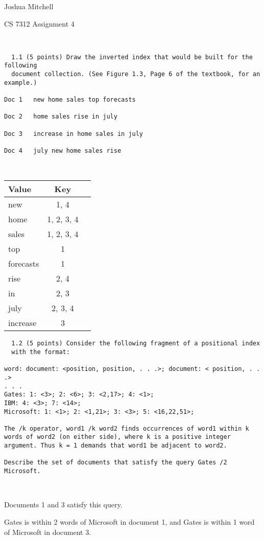 \documentclass[12pt]{article}
\begin{document}
Joshua Mitchell

CS 7312 Assignment 4

\

\begin{verbatim}
  1.1 (5 points) Draw the inverted index that would be built for the following
  document collection. (See Figure 1.3, Page 6 of the textbook, for an example.)

Doc 1 	new home sales top forecasts

Doc 2 	home sales rise in july

Doc 3 	increase in home sales in july

Doc 4 	july new home sales rise
\end{verbatim}


\

\begin{tabular}{l|cc}
  Value & Key& \\
  \hline
  new & 1, 4& \\
  home & 1, 2, 3, 4 & \\
  sales & 1, 2, 3, 4 & \\
  top & 1 & \\
  forecasts & 1 & \\
  rise & 2, 4 & \\
  in & 2, 3 & \\
  july & 2, 3, 4 & \\
  increase & 3 &
\end{tabular}

\begin{verbatim}
  1.2 (5 points) Consider the following fragment of a positional index
  with the format: 

word: document: <position, position, . . .>; document: < position, . . .> 
. . .
Gates: 1: <3>; 2: <6>; 3: <2,17>; 4: <1>;
IBM: 4: <3>; 7: <14>;
Microsoft: 1: <1>; 2: <1,21>; 3: <3>; 5: <16,22,51>;

The /k operator, word1 /k word2 finds occurrences of word1 within k words of word2 (on either side), where k is a positive integer argument. Thus k = 1 demands that word1 be adjacent to word2.

Describe the set of documents that satisfy the query Gates /2 Microsoft.
\end{verbatim}

\

Documents 1 and 3 satisfy this query.

Gates is within 2 words of Microsoft in document 1, and Gates is within 1 word of Microsoft in document 3.
\end{document}
